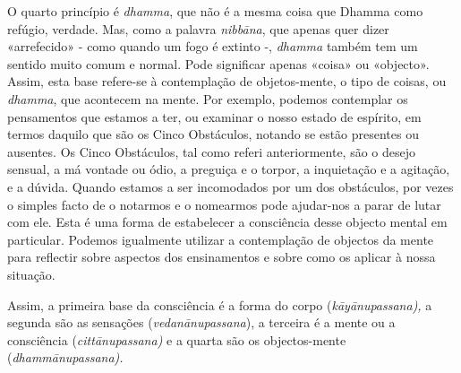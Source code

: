 O quarto princípio é \emph{dhamma}, que não é a mesma coisa que Dhamma
como refúgio, verdade. Mas, como a palavra \emph{nibbāna}, que apenas
quer dizer «arrefecido» - como quando um fogo é extinto -, \emph{dhamma}
também tem um sentido muito comum e normal. Pode significar apenas
«coisa» ou «objecto». Assim, esta base refere-se à contemplação de
objetos-mente, o tipo de coisas, ou \emph{dhamma}, que acontecem na
mente. Por exemplo, podemos contemplar os pensamentos que estamos a ter,
ou examinar o nosso estado de espírito, em termos daquilo que são os
Cinco Obstáculos, notando se estão presentes ou ausentes. Os Cinco
Obstáculos, tal como referi anteriormente, são o desejo sensual, a má
vontade ou ódio, a preguiça e o torpor, a inquietação e a agitação, e a
dúvida. Quando estamos a ser incomodados por um dos obstáculos, por
vezes o simples facto de o notarmos e o nomearmos pode ajudar-nos a
parar de lutar com ele. Esta é uma forma de estabelecer a consciência
desse objecto mental em particular. Podemos igualmente utilizar a
contemplação de objectos da mente para reflectir sobre aspectos dos
ensinamentos e sobre como os aplicar à nossa situação.

Assim, a primeira base da consciência é a forma do corpo
(\emph{kāyānupassana),} a segunda são as sensações
(\emph{vedanānupassana}), a terceira é a mente ou a consciência
(\emph{cittānupassana)} e a quarta são os objectos-mente
(\emph{dhammānupassana).}
